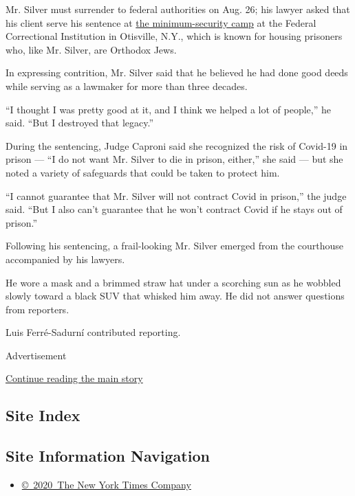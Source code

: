 Mr. Silver must surrender to federal authorities on Aug. 26; his lawyer
asked that his client serve his sentence at
\href{https://www.nytimes.com/2019/01/22/nyregion/michael-cohen-otisville-prison.html}{the
minimum-security camp} at the Federal Correctional Institution in
Otisville, N.Y., which is known for housing prisoners who, like Mr.
Silver, are Orthodox Jews.

In expressing contrition, Mr. Silver said that he believed he had done
good deeds while serving as a lawmaker for more than three decades.

``I thought I was pretty good at it, and I think we helped a lot of
people,'' he said. ``But I destroyed that legacy.''

During the sentencing, Judge Caproni said she recognized the risk of
Covid-19 in prison --- ``I do not want Mr. Silver to die in prison,
either,'' she said --- but she noted a variety of safeguards that could
be taken to protect him.

``I cannot guarantee that Mr. Silver will not contract Covid in
prison,'' the judge said. ``But I also can't guarantee that he won't
contract Covid if he stays out of prison.''

Following his sentencing, a frail-looking Mr. Silver emerged from the
courthouse accompanied by his lawyers.

He wore a mask and a brimmed straw hat under a scorching sun as he
wobbled slowly toward a black SUV that whisked him away. He did not
answer questions from reporters.

Luis Ferré-Sadurní contributed reporting.

Advertisement

\protect\hyperlink{after-bottom}{Continue reading the main story}

\hypertarget{site-index}{%
\subsection{Site Index}\label{site-index}}

\hypertarget{site-information-navigation}{%
\subsection{Site Information
Navigation}\label{site-information-navigation}}

\begin{itemize}
\tightlist
\item
  \href{https://help.nytimes.com/hc/en-us/articles/115014792127-Copyright-notice}{©~2020~The
  New York Times Company}
\end{itemize}

